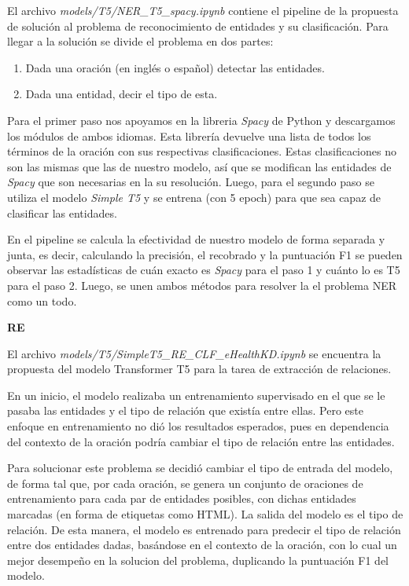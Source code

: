 \documentclass[10pt]{article} %
\begin{document}
	El archivo \textit{models/T5/NER\_T5\_spacy.ipynb} contiene el pipeline de la propuesta de soluci\'on al problema de reconocimiento de entidades y su clasificaci\'on. Para llegar a la soluci\'on se divide el problema en dos partes:
	\begin{enumerate}
		\item Dada una oraci\'on (en ingl\'es o espa\~nol) detectar las entidades.
		\item Dada una entidad, decir el tipo de esta.
	\end{enumerate}
		
	Para el primer paso nos apoyamos en la libreria \textit{Spacy} de Python y descargamos los m\'odulos de ambos idiomas. Esta librer\'ia devuelve una lista de todos los t\'erminos de la oraci\'on con sus respectivas clasificaciones.
	Estas clasificaciones no son las mismas que las de nuestro modelo, as\'i que se modifican las  entidades de \textit{Spacy} que son necesarias en la su resoluci\'on. Luego, para el segundo paso se utiliza el modelo \textit{Simple T5} y se entrena (con 5 epoch) para que sea capaz de clasificar las entidades.
	
	En el pipeline se calcula la efectividad de nuestro modelo de forma separada y junta, es decir, calculando la precisi\'on, el recobrado y la puntuación F1 se pueden observar las estad\'isticas de cu\'an exacto es \textit{Spacy} para el paso 1 y cu\'anto lo es T5 para el paso 2. Luego, se unen ambos m\'etodos para resolver la el problema NER como un todo.
	
	\textbf{RE}
	\vspace{0.5em}
	
	El archivo \textit{models/T5/SimpleT5\_RE\_CLF\_eHealthKD.ipynb} se encuentra la propuesta del modelo Transformer T5 para la tarea de extracción de relaciones.
	 	
	En un inicio, el modelo realizaba un entrenamiento supervisado en el que se le pasaba las entidades y el tipo de relación que existía entre ellas. Pero este enfoque en entrenamiento no dió los resultados esperados, pues en dependencia del contexto de la oración podría cambiar el tipo de relación entre las entidades.
	
	Para solucionar este problema se decidió cambiar el tipo de entrada del modelo, de forma tal que, por cada oración, se genera un conjunto de oraciones de entrenamiento para cada par de entidades posibles, con dichas  entidades marcadas (en forma de etiquetas como HTML). La salida del modelo es el tipo de relación. De esta manera, el modelo es entrenado para predecir el tipo de relación entre dos entidades dadas, basándose en el contexto de la oración, con lo cual un mejor desempeño en la soluci\;on del problema, duplicando la puntuación F1 del modelo.
	
\end{document}
